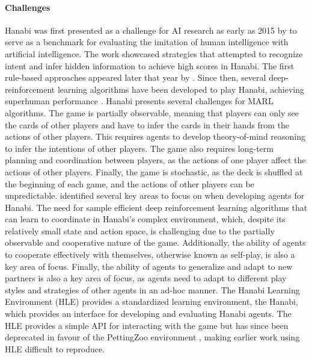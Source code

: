 \paragraph*{Challenges}
Hanabi was first presented as a challenge for AI research as early as 2015 by \textcite{osawaSolvingHanabiEstimating2015} to serve as a benchmark for evaluating the imitation of human intelligence with artificial intelligence. The work showcased strategies that attempted to recognize intent and infer hidden information to achieve high scores in Hanabi. The first rule-based approaches appeared later that year by \textcite{coxHowMakePerfect2015}. Since then, several deep-reinforcement learning algorithms have been developed to play Hanabi, achieving superhuman performance \cite{huSimplifiedActionDecoder2021, canaanEvaluatingRlAgents2020, foersterBayesianActionDecoder2019}.
Hanabi presents several challenges for MARL algorithms. The game is partially observable, meaning that players can only see the cards of other players and have to infer the cards in their hands from the actions of other players. This requires agents to develop theory-of-mind reasoning to infer the intentions of other players. The game also requires long-term planning and coordination between players, as the actions of one player affect the actions of other players. Finally, the game is stochastic, as the deck is shuffled at the beginning of each game, and the actions of other players can be unpredictable.
\textcite{bardHanabiChallengeNew2020a} identified several key areas to focus on when developing agents for Hanabi. The need for sample efficient deep reinforcement learning algorithms that can learn to coordinate in Hanabi's complex environment, which, despite its relatively small state and action space, is challenging due to the partially observable and cooperative nature of the game. Additionally, the ability of agents to cooperate effectively with themselves, otherwise known as self-play, is also a key area of focus. Finally, the ability of agents to generalize and adapt to new partners is also a key area of focus, as agents need to adapt to different play styles and strategies of other agents in an ad-hoc manner.
The Hanabi Learning Environment (HLE) \textcite{bardHanabiChallengeNew2020a} provides a standardized learning environment, the Hanabi, which provides an interface for developing and evaluating Hanabi agents. The HLE provides a simple API for interacting with the game but has since been deprecated in favour of the PettingZoo environment \cite{PettingZooDocumentation}, making earlier work using HLE difficult to reproduce.
